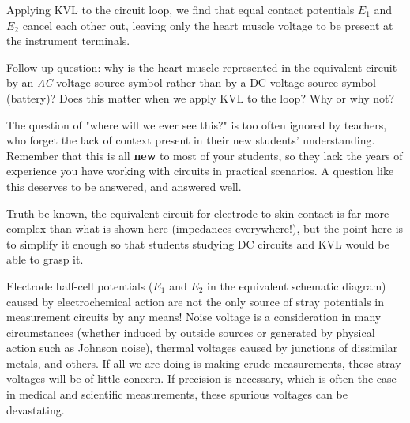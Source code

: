 
Applying KVL to the circuit loop, we find that equal contact potentials $E_1$ and $E_2$ cancel each other out, leaving only the heart muscle voltage to be present at the instrument terminals.

\vskip 10pt

Follow-up question: why is the heart muscle represented in the equivalent circuit by an {\it AC} voltage source symbol rather than by a DC voltage source symbol (battery)?  Does this matter when we apply KVL to the loop?  Why or why not?







The question of "where will we ever see this?" is too often ignored by teachers, who forget the lack of context present in their new students' understanding.  Remember that this is all {\bf new} to most of your students, so they lack the years of experience you have working with circuits in practical scenarios.  A question like this deserves to be answered, and answered well.

Truth be known, the equivalent circuit for electrode-to-skin contact is far more complex than what is shown here (impedances everywhere!), but the point here is to simplify it enough so that students studying DC circuits and KVL would be able to grasp it.

Electrode half-cell potentials ($E_1$ and $E_2$ in the equivalent schematic diagram) caused by electrochemical action are not the only source of stray potentials in measurement circuits by any means!  Noise voltage is a consideration in many circumstances (whether induced by outside sources or generated by physical action such as Johnson noise), thermal voltages caused by junctions of dissimilar metals, and others.  If all we are doing is making crude measurements, these stray voltages will be of little concern.  If precision is necessary, which is often the case in medical and scientific measurements, these spurious voltages can be devastating.




